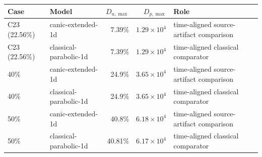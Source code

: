 \begin{tabular}{llrrl}
\toprule
Case & Model & \(D_{u,\max}\) & \(D_{p,\max}\) & Role \\
\midrule
C23 (22.56\%) & canic-extended-1d & 7.39\% & \(1.29\times10^{4}\) & time-aligned source-artifact comparison \\
C23 (22.56\%) & classical-parabolic-1d & 7.39\% & \(1.29\times10^{4}\) & time-aligned classical comparator \\
40\% & canic-extended-1d & 24.9\% & \(3.65\times10^{4}\) & time-aligned source-artifact comparison \\
40\% & classical-parabolic-1d & 24.9\% & \(3.65\times10^{4}\) & time-aligned classical comparator \\
50\% & canic-extended-1d & 40.8\% & \(6.18\times10^{4}\) & time-aligned source-artifact comparison \\
50\% & classical-parabolic-1d & 40.81\% & \(6.17\times10^{4}\) & time-aligned classical comparator \\
\bottomrule
\end{tabular}
